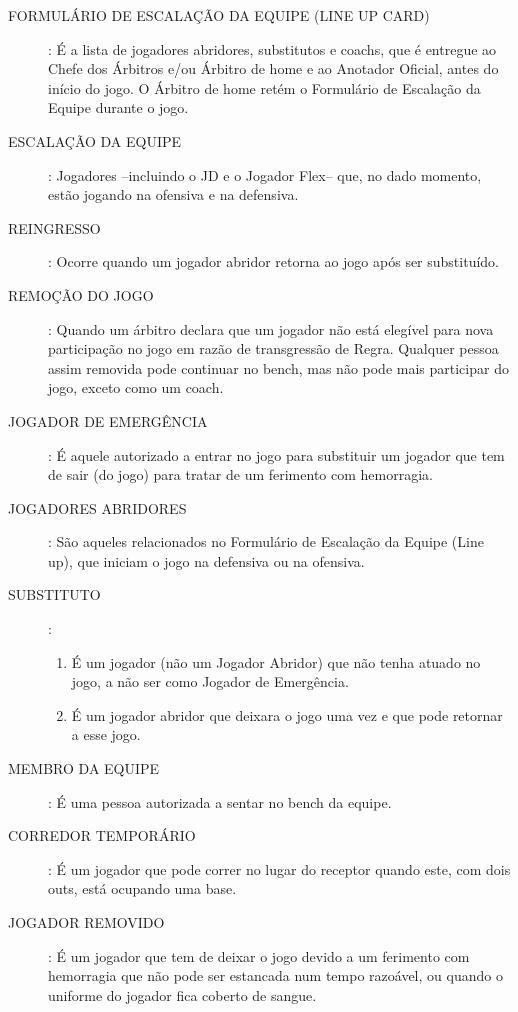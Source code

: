 \begin{description}
		
	\item[FORMUL\'ARIO DE ESCALA\c{C}ÃO DA EQUIPE (LINE UP CARD)]: \'E a lista de jogadores abridores, substitutos e \glspl{coach}, que \'e entregue ao Chefe dos \'Arbitros e/ou \'Arbitro de \gls{home} e ao Anotador Oficial, antes do in\'icio do jogo. O \'Arbitro de \gls{home} ret\'em o Formul\'ario de Escala\c{c}\~ao da Equipe durante o jogo. 
	
	\item[ESCALA\c{C}ÃO DA EQUIPE]: Jogadores –incluindo o JD e o Jogador Flex– que, no dado momento, est\~ao jogando na ofensiva e na defensiva.
	

	
	\item[REINGRESSO]: 	Ocorre quando um jogador abridor retorna ao jogo ap\'os ser substitu\'ido. 
	
	\item[REMO\c{C}ÃO DO JOGO]: Quando um \'arbitro declara que um jogador n\~ao est\'a eleg\'ivel para nova participa\c{c}\~ao no jogo em raz\~ao de transgress\~ao de Regra. Qualquer pessoa assim removida pode continuar no \gls{bench}, mas n\~ao pode mais participar do jogo, exceto como um \gls{coach}. 
	
	\item[JOGADOR DE EMERGÊNCIA]: \'E aquele autorizado a entrar no jogo para substituir um jogador que tem de sair (do jogo) para tratar de um ferimento com hemorragia. 
	
	\item[JOGADORES ABRIDORES ]: S\~ao aqueles relacionados no Formul\'ario de Escala\c{c}\~ao da Equipe (Line up), que iniciam o jogo na defensiva ou na ofensiva. 
	
	\item[SUBSTITUTO]: 
	\begin{enumerate}[label=\alph*)]
		\item \'E um jogador (n\~ao um Jogador Abridor) que n\~ao tenha atuado no jogo, a n\~ao ser como Jogador de Emerg\^encia. 
		
		\item  \'E um jogador abridor que deixara o jogo uma vez e que pode retornar a esse jogo. 
	\end{enumerate}
	
	\item[MEMBRO DA EQUIPE]: 
	\'E uma pessoa autorizada a sentar no \gls{bench} da equipe. 
	
	\item[CORREDOR TEMPOR\'ARIO]:  
	\'E um jogador que pode correr no lugar do receptor quando este, com dois \glspl{out}, est\'a ocupando uma base. 
	
	\item[JOGADOR REMOVIDO]:  \'E um jogador que tem de deixar o jogo devido a um ferimento com hemorragia que n\~ao pode ser estancada num tempo razo\'avel, ou quando o uniforme do jogador fica coberto de sangue. 
\end{description}


